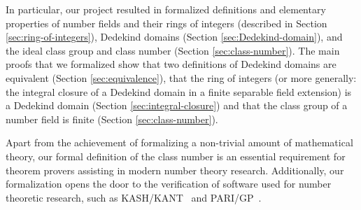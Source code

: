 \documentclass[a4paper,USenglish,cleveref, autoref, thm-restate]{lipics-v2021}
\begin{document}
In particular, our project resulted in formalized definitions and elementary properties of
number fields and their rings of integers (described in Section \ref{sec:ring-of-integers}),
Dedekind domains (Section \ref{sec:Dedekind-domain}),
and the ideal class group and class number (Section \ref{sec:class-number}).
The main proofs that we formalized show
that two definitions of Dedekind domains are equivalent (Section \ref{sec:equivalence}),
that the ring of integers (or more generally: the integral closure of a Dedekind domain in a finite separable field extension) is a Dedekind domain (Section \ref{sec:integral-closure})
and that the class group of a number field is finite (Section \ref{sec:class-number}).
%
%
%

Apart from the achievement of formalizing a non-trivial amount of mathematical theory,
our formal definition of the class number is an essential requirement
for theorem provers assisting in modern number theory research.
Additionally, our formalization opens the door to the verification of software used for number theoretic research,
such as KASH/KANT~\cite{kash} and PARI/GP~\cite{PARI2}.
\end{document}
